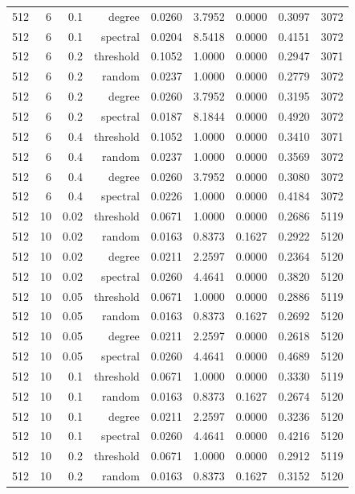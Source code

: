 \begin{table}[t]
\begin{tabular}{lrrrrrrrr}
512 & 6 & 0.1 & degree & 0.0260 & 3.7952 & 0.0000 & 0.3097 & 3072 \\
512 & 6 & 0.1 & spectral & 0.0204 & 8.5418 & 0.0000 & 0.4151 & 3072 \\
512 & 6 & 0.2 & threshold & 0.1052 & 1.0000 & 0.0000 & 0.2947 & 3071 \\
512 & 6 & 0.2 & random & 0.0237 & 1.0000 & 0.0000 & 0.2779 & 3072 \\
512 & 6 & 0.2 & degree & 0.0260 & 3.7952 & 0.0000 & 0.3195 & 3072 \\
512 & 6 & 0.2 & spectral & 0.0187 & 8.1844 & 0.0000 & 0.4920 & 3072 \\
512 & 6 & 0.4 & threshold & 0.1052 & 1.0000 & 0.0000 & 0.3410 & 3071 \\
512 & 6 & 0.4 & random & 0.0237 & 1.0000 & 0.0000 & 0.3569 & 3072 \\
512 & 6 & 0.4 & degree & 0.0260 & 3.7952 & 0.0000 & 0.3080 & 3072 \\
512 & 6 & 0.4 & spectral & 0.0226 & 1.0000 & 0.0000 & 0.4184 & 3072 \\
512 & 10 & 0.02 & threshold & 0.0671 & 1.0000 & 0.0000 & 0.2686 & 5119 \\
512 & 10 & 0.02 & random & 0.0163 & 0.8373 & 0.1627 & 0.2922 & 5120 \\
512 & 10 & 0.02 & degree & 0.0211 & 2.2597 & 0.0000 & 0.2364 & 5120 \\
512 & 10 & 0.02 & spectral & 0.0260 & 4.4641 & 0.0000 & 0.3820 & 5120 \\
512 & 10 & 0.05 & threshold & 0.0671 & 1.0000 & 0.0000 & 0.2886 & 5119 \\
512 & 10 & 0.05 & random & 0.0163 & 0.8373 & 0.1627 & 0.2692 & 5120 \\
512 & 10 & 0.05 & degree & 0.0211 & 2.2597 & 0.0000 & 0.2618 & 5120 \\
512 & 10 & 0.05 & spectral & 0.0260 & 4.4641 & 0.0000 & 0.4689 & 5120 \\
512 & 10 & 0.1 & threshold & 0.0671 & 1.0000 & 0.0000 & 0.3330 & 5119 \\
512 & 10 & 0.1 & random & 0.0163 & 0.8373 & 0.1627 & 0.2674 & 5120 \\
512 & 10 & 0.1 & degree & 0.0211 & 2.2597 & 0.0000 & 0.3236 & 5120 \\
512 & 10 & 0.1 & spectral & 0.0260 & 4.4641 & 0.0000 & 0.4216 & 5120 \\
512 & 10 & 0.2 & threshold & 0.0671 & 1.0000 & 0.0000 & 0.2912 & 5119 \\
512 & 10 & 0.2 & random & 0.0163 & 0.8373 & 0.1627 & 0.3152 & 5120 \\

\end{tabular}
\end{table}
